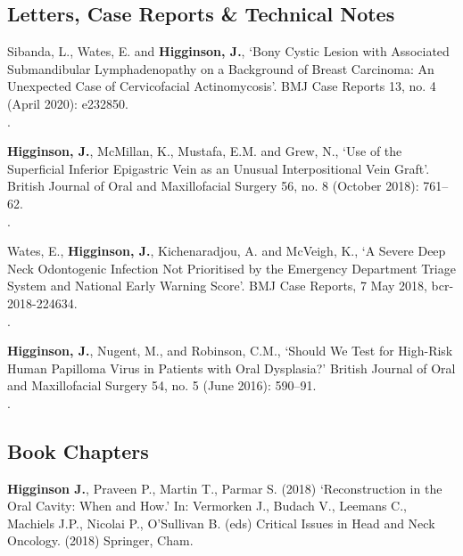 \subsection*{Letters, Case Reports \& Technical Notes}

 Sibanda, L., Wates, E. and \textbf{Higginson, J.}, `Bony Cystic Lesion with Associated Submandibular Lymphadenopathy on a Background of Breast Carcinoma: An Unexpected Case of Cervicofacial Actinomycosis’. BMJ Case Reports 13, no. 4 (April 2020): e232850. 
\\.

\vspace{0.1cm}

 \textbf{Higginson, J.}, McMillan, K., Mustafa, E.M.  and Grew, N., `Use of the Superficial Inferior Epigastric Vein as an Unusual Interpositional Vein Graft’. British Journal of Oral and Maxillofacial Surgery 56, no. 8 (October 2018): 761–62. 
\\.

\vspace{0.1cm}

 Wates, E., \textbf{Higginson, J.}, Kichenaradjou, A. and McVeigh, K., `A Severe Deep Neck Odontogenic Infection Not Prioritised by the Emergency Department Triage System and National Early Warning Score’. BMJ Case Reports, 7 May 2018, bcr-2018-224634. 
\\.

\vspace{0.1cm}

 \textbf{Higginson, J.}, Nugent, M., and Robinson, C.M., `Should We Test for High-Risk Human Papilloma Virus in Patients with Oral Dysplasia?’ British Journal of Oral and Maxillofacial Surgery 54, no. 5 (June 2016): 590–91. 
\\.



\subsection*{Book Chapters}

 \textbf{Higginson J.}, Praveen P., Martin T., Parmar S. (2018) `Reconstruction in the Oral Cavity: When and How.' In: Vermorken J., Budach V., Leemans C., Machiels J.P., Nicolai P., O'Sullivan B. (eds) Critical Issues in Head and Neck Oncology. (2018) Springer, Cham. 
\\



